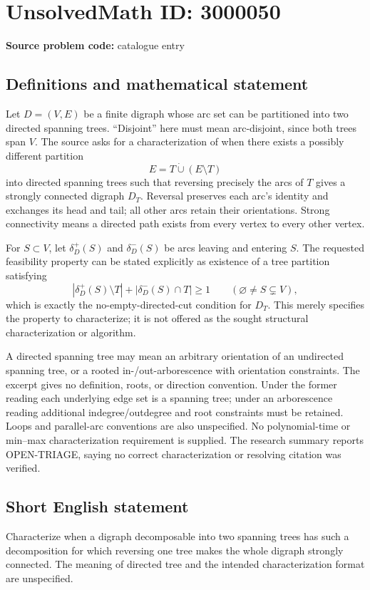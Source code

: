 \documentclass[11pt]{article}
\begin{document}
\section*{UnsolvedMath ID: 3000050}
\textbf{Source problem code:} catalogue entry
\subsection{Definitions and mathematical statement}
Let \(D=(V,E)\) be a finite digraph whose arc set can be partitioned into two directed spanning trees. ``Disjoint'' here must mean arc-disjoint, since both trees span \(V\). The source asks for a characterization of when there exists a possibly different partition
\[
E=T\mathbin{\dot\cup}(E\setminus T)
\]
into directed spanning trees such that reversing precisely the arcs of \(T\) gives a strongly connected digraph \(D_T\). Reversal preserves each arc's identity and exchanges its head and tail; all other arcs retain their orientations. Strong connectivity means a directed path exists from every vertex to every other vertex.

For \(S\subset V\), let \(\delta_D^+(S)\) and \(\delta_D^-(S)\) be arcs leaving and entering \(S\). The requested feasibility property can be stated explicitly as existence of a tree partition satisfying
\[
|\delta_D^+(S)\setminus T|+|\delta_D^-(S)\cap T|\ge1
\qquad(\varnothing\ne S\subsetneq V),
\]
which is exactly the no-empty-directed-cut condition for \(D_T\). This merely specifies the property to characterize; it is not offered as the sought structural characterization or algorithm.

A directed spanning tree may mean an arbitrary orientation of an undirected spanning tree, or a rooted in-/out-arborescence with orientation constraints. The excerpt gives no definition, roots, or direction convention. Under the former reading each underlying edge set is a spanning tree; under an arborescence reading additional indegree/outdegree and root constraints must be retained. Loops and parallel-arc conventions are also unspecified. No polynomial-time or min--max characterization requirement is supplied. The research summary reports OPEN-TRIAGE, saying no correct characterization or resolving citation was verified.
\subsection{Short English statement}
Characterize when a digraph decomposable into two spanning trees has such a decomposition for which reversing one tree makes the whole digraph strongly connected. The meaning of directed tree and the intended characterization format are unspecified.
\end{document}
